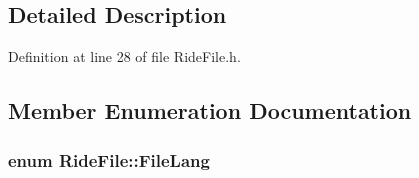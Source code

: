 \subsection{Detailed Description}


Definition at line 28 of file Ride\-File.\-h.



\subsection{Member Enumeration Documentation}
\hypertarget{class_ride_file_af2f1eb81fe20b91d4d3b8d96e457380a}{
\subsubsection[{File\-Lang}]{\setlength{\rightskip}{0pt plus 5cm}enum {\bf Ride\-File\-::\-File\-Lang}\hspace{0.3cm}{\ttfamily [private]}}}\label{class_ride_file_af2f1eb81fe20b91d4d3b8d96e457380a}
